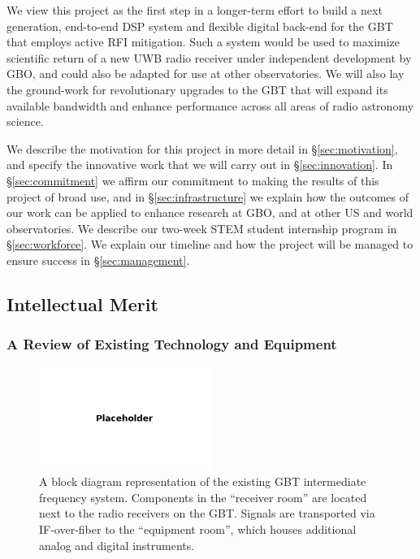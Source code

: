 \documentclass[10pt]{myNSF}
\begin{document}
We view this project as the first step in a longer-term effort to
build a next generation, end-to-end DSP system and flexible digital
back-end for the GBT that employs active RFI mitigation.  Such a
system would be used to maximize scientific return of a new UWB radio
receiver under independent development by GBO, and could also be
adapted for use at other observatories.  We will also lay the
ground-work for revolutionary upgrades to the GBT that will expand its
available bandwidth and enhance performance across all areas of radio
astronomy science.

We describe the motivation for this project in more detail in
\S\ref{sec:motivation}, and specify the innovative work that we will
carry out in \S\ref{sec:innovation}.  In \S\ref{sec:commitment} we
affirm our commitment to making the results of this project of broad
use, and in \S\ref{sec:infrastructure} we explain how the outcomes of
our work can be applied to enhance research at GBO, and at other US
and world observatories.  We describe our two-week STEM student
internship program in \S\ref{sec:workforce}.  We explain our timeline
and how the project will be managed to ensure success in
\S\ref{sec:management}.

\subsection{Intellectual Merit}
\label{sec:intellectual_merit}

\subsubsection{A Review of Existing Technology and Equipment}
\label{sec:review}

\begin{figure}
  \centering
  \includegraphics[width=0.5\textwidth]{placeholder.png}
  \caption{A block diagram representation of the existing GBT
    intermediate frequency system.  Components in the ``receiver
    room'' are located next to the radio receivers on the GBT.
    Signals are transported via IF-over-fiber to the ``equipment
    room'', which houses additional analog and digital
    instruments. \label{fig:gbt_if}}
\end{figure}
  
\end{document}
